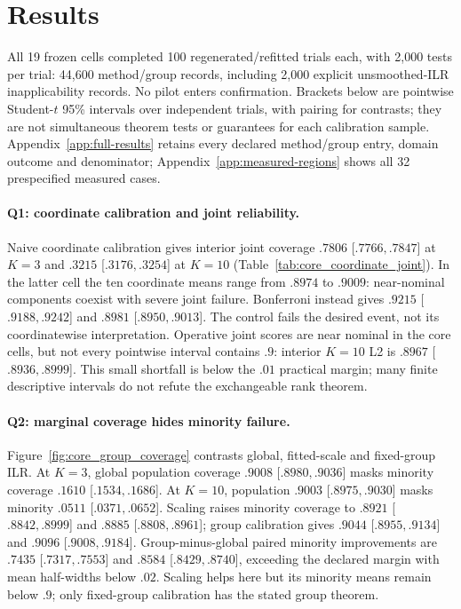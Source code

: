 \section{Results}
\label{sec:results}
All 19 frozen cells completed 100 regenerated/refitted trials each, with 2,000 tests per trial: 44,600 method/group records, including 2,000 explicit unsmoothed-ILR inapplicability records. No pilot enters confirmation. Brackets below are pointwise Student-$t$ 95\% intervals over independent trials, with pairing for contrasts; they are not simultaneous theorem tests or guarantees for each calibration sample. Appendix~\ref{app:full-results} retains every declared method/group entry, domain outcome and denominator; Appendix~\ref{app:measured-regions} shows all 32 prespecified measured cases.


\paragraph{Q1: coordinate calibration and joint reliability.}
Naive coordinate calibration gives interior joint coverage $.7806$ [$ .7766,.7847$] at $K=3$ and $.3215$ [$ .3176,.3254$] at $K=10$ (Table~\ref{tab:core_coordinate_joint}). In the latter cell the ten coordinate means range from $.8974$ to $.9009$: near-nominal components coexist with severe joint failure. Bonferroni instead gives $.9215$ [$ .9188,.9242$] and $.8981$ [$ .8950,.9013$]. The control fails the desired event, not its coordinatewise interpretation. Operative joint scores are near nominal in the core cells, but not every pointwise interval contains $.9$: interior $K=10$ L2 is $.8967$ [$ .8936,.8999$]. This small shortfall is below the $.01$ practical margin; many finite descriptive intervals do not refute the exchangeable rank theorem.

\paragraph{Q2: marginal coverage hides minority failure.}
Figure~\ref{fig:core_group_coverage} contrasts global, fitted-scale and fixed-group ILR. At $K=3$, global population coverage $.9008$ [$ .8980,.9036$] masks minority coverage $.1610$ [$ .1534,.1686$]. At $K=10$, population $.9003$ [$ .8975,.9030$] masks minority $.0511$ [$ .0371,.0652$]. Scaling raises minority coverage to $.8921$ [$ .8842,.8999$] and $.8885$ [$ .8808,.8961$]; group calibration gives $.9044$ [$ .8955,.9134$] and $.9096$ [$ .9008,.9184$]. Group-minus-global paired minority improvements are $.7435$ [$ .7317,.7553$] and $.8584$ [$ .8429,.8740$], exceeding the declared margin with mean half-widths below $.02$. Scaling helps here but its minority means remain below $.9$; only fixed-group calibration has the stated group theorem.

